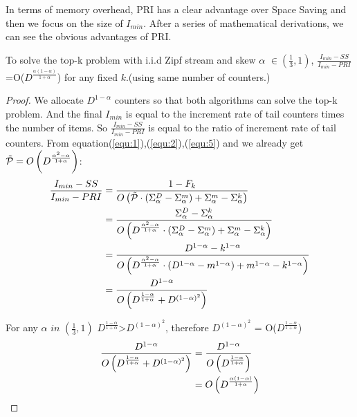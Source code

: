 In terms of memory overhead, PRI has a clear advantage over Space Saving and then we focus on the size of $I_{min}$. After a series of mathematical derivations, we can see the obvious advantages of PRI.

\begin{theorem}
	To solve the top-k problem with i.i.d Zipf stream and skew $\alpha$ $\in(\frac{1}{3},1)$, $\frac{I_{min}-SS}{I_{min}-PRI}$=O($D^\frac{\alpha(1-\alpha)}{1+\alpha}$) for any fixed $k$.(using same number of counters.) 
\end{theorem}
\begin{proof}
We allocate $D^{1-\alpha}$ counters so that both algorithms can solve the top-k problem. And the final $I_{min}$ is equal to the increment rate of tail counters times the number of items. So $\frac{I_{min}-SS}{I_{min}-PRI}$ is equal to the ratio of increment rate of tail counters.
From equation(\ref{equ:1}),(\ref{equ:2}),(\ref{equ:5}) and we already get $\Tilde{\mathcal{P}}=O\left(D^{\frac{\alpha^2-\alpha}{1+\alpha}}\right)$:
\begin{equation}
\begin{aligned}
\centering  
\label{equ:8}
\frac{I_{min}-SS}{I_{min}-PRI} &= \frac{1-F_k}{O\left(\Tilde{\mathcal{P}}\cdot\left(\Sigma_\alpha^D-\Sigma_\alpha^m\right)+\Sigma_\alpha^m-\Sigma_\alpha^k\right)}\\
&=\frac{\Sigma_\alpha^D-\Sigma_\alpha^k}{O\left(D^{\frac{\alpha^2-\alpha}{1+\alpha}}\cdot\left(\Sigma_\alpha^D-\Sigma_\alpha^m\right)+\Sigma_\alpha^m-\Sigma_\alpha^k\right)}\\
&=\frac{D^{1-\alpha}-k^{1-\alpha}}{O\left(D^{\frac{\alpha^2-\alpha}{1+\alpha}}\cdot\left(D^{1-\alpha}-m^{1-\alpha}\right)+m^{1-\alpha}-k^{1-\alpha}\right)}\\
&= \frac{D^{1-\alpha}}{O\left(D^\frac{1-\alpha}{1+\alpha}+D^{\left(1-\alpha\right)^2}\right)}
\end{aligned}
\end{equation}

For any $\alpha$ $in$ $(\frac{1}{3},1)$ $D^{\frac{1-\alpha}{1+\alpha}}$>$D^{(1-\alpha)^2}$, therefore $D^{(1-\alpha)^2}$ = O($D^{\frac{1-\alpha}{1+\alpha}}$)
\begin{equation}
\begin{aligned}
\centering  
\frac{D^{1-\alpha}}{O\left(D^\frac{1-\alpha}{1+\alpha}+D^{\left(1-\alpha\right)^2}\right)} &= \frac{D^{1-\alpha}}{O\left(D^{\frac{1-\alpha}{1+\alpha}}\right)}\\
&= O\left(D^\frac{\alpha\left(1-\alpha\right)}{1+\alpha}\right)
\end{aligned}
\end{equation}
\end{proof}

